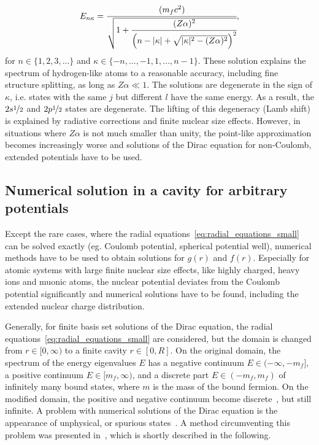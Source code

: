 \begin{equation}
\label{eq:finestructure_formula}
E_{n\kappa}=\cfrac{(m_fc^2)}{\sqrt{1+\cfrac{(Z\alpha)^2}{\left( n-|\kappa|+\sqrt{|\kappa|^2-(Z\alpha)^2} \right)^2}}},
\end{equation}
for $n\in \{1,2,3,...\}$ and $\kappa \in \{{-}{n},...,-1,1,...,n-1\}$.
These solution explains the spectrum of hydrogen-like atoms to a reasonable accuracy, including fine structure splitting, as long as $Z\alpha\ll 1$. The solutions are degenerate in the sign of $\kappa$, i.e. states with the same $j$ but different $l$ have the same energy. As a result, the $2s\nicefrac{1}{2}$ and $2p\nicefrac{1}{2}$ states are degenerate. The lifting of this degeneracy (Lamb shift) is explained by radiative corrections and finite nuclear size effects. However, in situations where $Z\alpha$ is not much smaller than unity, the point-like approximation becomes increasingly worse and solutions of the Dirac equation for non-Coulomb, extended potentials have to be used.



\subsection{Numerical solution in a cavity for arbitrary potentials}
Except the rare cases, where the radial equations~\eqref{eq:radial_equations_small} can be solved exactly (eg. Coulomb potential, spherical potential well), numerical methods have to be used to obtain solutions for $g(r)$ and $f(r)$. Especially for atomic systems with large finite nuclear size effects, like highly charged, heavy ions and muonic atoms, the nuclear potential deviates from the Coulomb potential significantly and numerical solutions have to be found, including the extended nuclear charge distribution.
 
Generally, for finite basis set solutions of the Dirac equation, the radial equations~\eqref{eq:radial_equations_small} are considered, but the domain is changed from $r\in[0,\infty)$ to a finite cavity $r\in [0,R]$. On the original domain, the spectrum of the energy eigenvalues $E$ has a negative continuum $E\in (-\infty,-m_f]$, a positive continuum $E\in [m_f,\infty)$, and a discrete part $E\in (-m_f,m_f)$ of infinitely many bound states, where $m$ is the mass of the bound fermion. On the modified domain, the positive and negative continuum become discrete~\cite{johnson1988}, but still infinite.
A problem with numerical solutions of the Dirac equation is the appearance of unphysical, or spurious states~\cite{johnson1988, drake1981}. A method circumventing this problem was presented in~\cite{Shabaev2004}, which is shortly described in the following.

